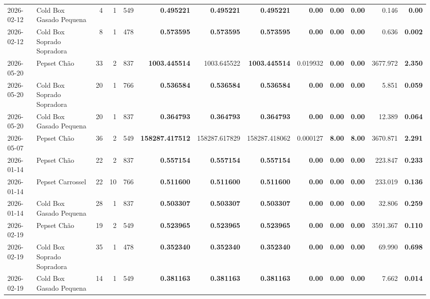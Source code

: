 {\begin{center}
{\begin{tabular}{@{}llrrrrrrrrrrr@{}}
2026-02-12 & Cold Box Gasado Pequena & 4 & 1 & 549 & \textbf{0.495221} & \textbf{0.495221} & \textbf{0.495221} & \textbf{0.00} & \textbf{0.00} & \textbf{0.00} & 0.146 & \textbf{0.00} \\
2026-02-12 & Cold Box Soprado Sopradora & 8 & 1 & 478 & \textbf{0.573595} & \textbf{0.573595} & \textbf{0.573595} & \textbf{0.00} & \textbf{0.00} & \textbf{0.00} & 0.636 & \textbf{0.002} \\
2026-05-20 & Pepset Chão & 33 & 2 & 837 & \textbf{1003.445514} & 1003.645522 & \textbf{1003.445514} & 0.019932 & \textbf{0.00} & \textbf{0.00} & 3677.972 & \textbf{2.350} \\
2026-05-20 & Cold Box Soprado Sopradora & 20 & 1 & 766 & \textbf{0.536584} & \textbf{0.536584} & \textbf{0.536584} & \textbf{0.00} & \textbf{0.00} & \textbf{0.00} & 5.851 & \textbf{0.059} \\
2026-05-20 & Cold Box Gasado Pequena & 20 & 1 & 837 & \textbf{0.364793} & \textbf{0.364793} & \textbf{0.364793} & \textbf{0.00} & \textbf{0.00} & \textbf{0.00} & 12.389 & \textbf{0.064} \\
2026-05-07 & Pepset Chão & 36 & 2 & 549 & \textbf{158287.417512} & 158287.617829 & 158287.418062 & 0.000127 & \textbf{8.00} & \textbf{8.00} & 3670.871 & \textbf{2.291} \\
2026-01-14 & Pepset Chão & 22 & 2 & 837 & \textbf{0.557154} & \textbf{0.557154} & \textbf{0.557154} & \textbf{0.00} & \textbf{0.00} & \textbf{0.00} & 223.847 & \textbf{0.233} \\
2026-01-14 & Pepset Carrossel & 22 & 10 & 766 & \textbf{0.511600} & \textbf{0.511600} & \textbf{0.511600} & \textbf{0.00} & \textbf{0.00} & \textbf{0.00} & 233.019 & \textbf{0.136} \\
2026-01-14 & Cold Box Gasado Pequena & 28 & 1 & 837 & \textbf{0.503307} & \textbf{0.503307} & \textbf{0.503307} & \textbf{0.00} & \textbf{0.00} & \textbf{0.00} & 32.806 & \textbf{0.259} \\
2026-02-19 & Pepset Chão & 19 & 2 & 549 & \textbf{0.523965} & \textbf{0.523965} & \textbf{0.523965} & \textbf{0.00} & \textbf{0.00} & \textbf{0.00} & 3591.367 & \textbf{0.110} \\
2026-02-19 & Cold Box Soprado Sopradora & 35 & 1 & 478 & \textbf{0.352340} & \textbf{0.352340} & \textbf{0.352340} & \textbf{0.00} & \textbf{0.00} & \textbf{0.00} & 69.990 & \textbf{0.698} \\
2026-02-19 & Cold Box Gasado Pequena & 14 & 1 & 549 & \textbf{0.381163} & \textbf{0.381163} & \textbf{0.381163} & \textbf{0.00} & \textbf{0.00} & \textbf{0.00} & 7.662 & \textbf{0.014} \\

\end{tabular}}
\end{center}}
